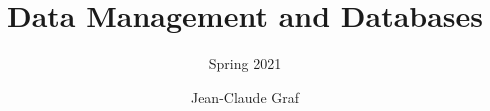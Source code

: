 \documentclass{scrartcl}
\begin{document}
    \rhead{\leftmark}

    \title{Data Management and Databases}
    \subtitle{Spring 2021}
    \author{Jean-Claude Graf}
    \maketitle

    \tableofcontents

    
    
    
    
    
    
    
    
    
    
    
    
    
    
    
    
\end{document}
